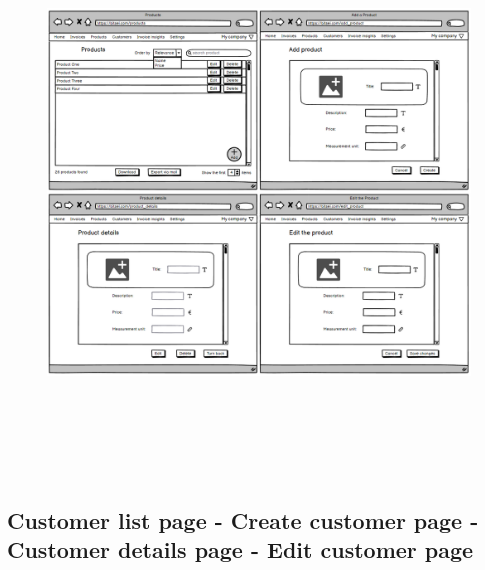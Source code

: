 \begin{figure}[h!]
    \centering
    \includegraphics[height=420pt, keepaspectratio]{resources/mockup/Product.png}
\end{figure}


\newpage
\subsection{Customer list page - Create customer page - Customer details page - Edit customer page}

